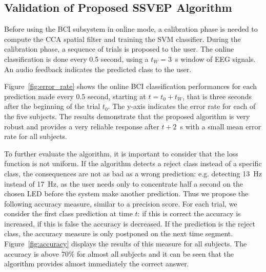\subsection{Validation of Proposed SSVEP Algorithm}
\label{sec:resssvep}

\newcommand{\win}{\ensuremath{t_W}}

Before using the BCI subsystem in online mode, a calibration phase is needed to compute the CCA spatial filter and training the SVM classifier.
During the calibration phase, a sequence of trials is proposed to the user.
The online classification is done every 0.5 second, using a $\win = 3$~s window of EEG signals. 
An audio feedback indicates the predicted class to the user. %

Figure~\ref{fig:error_rate} shows the online BCI classification performances for each prediction made every 0.5 second, starting at $t=t_0+\win$, that is three seconds after the beginning of the trial $t_0$. 
The y-axis indicates the error rate for each of the five subjects.
The results demonstrate that the proposed algorithm is very robust and provides a very reliable response after $t+2$~s with a small mean error rate for all subjects. 

To further evaluate the algorithm, it is important to consider that the loss function is not uniform. 
If the algorithm detects a reject class instead of a specific class, the consequences are not as bad as a wrong prediction: e.g. detecting 13~Hz instead of 17~Hz, as the user needs only to concentrate half a second on the chosen LED before the system make another prediction.
Thus we propose the following accuracy measure, similar to a precision score.
For each trial, we consider the first class prediction at time $t$: if this is correct the accuracy is increased, if this is false the accuracy is decreased.
If the prediction is the reject class, the accuracy measure is only postponed on the next time segment.
Figure~\ref{fig:accuracy} displays the results of this measure for all subjects.
The accuracy is above 70\% for almost all subjects and it can be seen that the algorithm provides almost immediately the correct answer.

